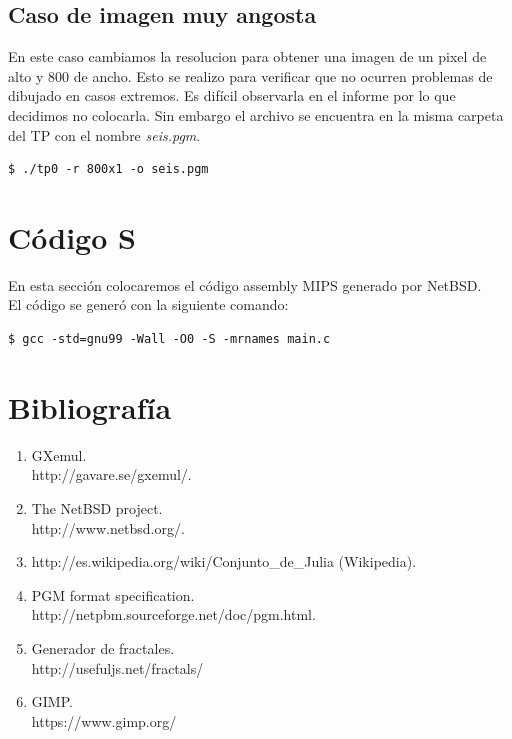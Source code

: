 \documentclass[a4paper,10pt]{article}
\begin{document}
\newpage

\subsection{Caso de imagen muy angosta}
En este caso cambiamos la resolucion para obtener una imagen de un pixel
de alto y 800 de ancho. \newline
Esto se realizo para verificar que no ocurren problemas de dibujado en casos extremos.
Es dif\'{i}cil observarla en el informe por lo que decidimos no colocarla. Sin embargo el archivo se encuentra en la misma carpeta del TP con el nombre \textit{seis.pgm}.

\begin{lstlisting}[frame=single]
$ ./tp0 -r 800x1 -o seis.pgm
\end{lstlisting}

\section{C\'{o}digo S}

En esta secci\'{o}n colocaremos el c\'{o}digo assembly MIPS generado por NetBSD. \\
El c\'{o}digo se gener\'{o} con la siguiente comando:

\begin{lstlisting}[frame=single]
$ gcc -std=gnu99 -Wall -O0 -S -mrnames main.c
\end{lstlisting}



\newpage

\section{Bibliograf\'{i}a}
\begin{enumerate}
\item GXemul. \\ http://gavare.se/gxemul/.
\item The NetBSD project. \\
	http://www.netbsd.org/.
\item http://es.wikipedia.org/wiki/Conjunto\_de\_Julia (Wikipedia).
\item PGM format specification.\\
	http://netpbm.sourceforge.net/doc/pgm.html.
\item Generador de fractales. \\
	http://usefuljs.net/fractals/
\item GIMP. \\
	https://www.gimp.org/
\end{enumerate}
\end{document}
